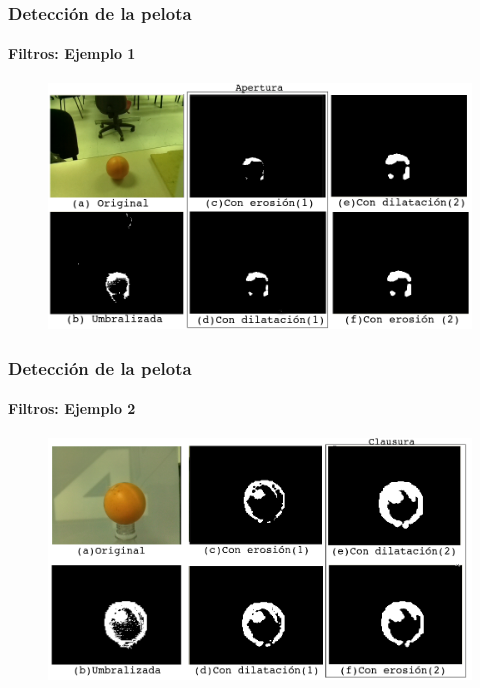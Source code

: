 \documentclass{beamer}
\begin{document}
\begin{frame}
\frametitle{Detecci\'on de la pelota}
\framesubtitle{Filtros: Ejemplo 1}

\begin{figure}[hbtp]
\centering
\includegraphics[scale=0.3]{filtros.png} 
\end{figure}

\end{frame}

\begin{frame}
\frametitle{Detecci\'on de la pelota}
\framesubtitle{Filtros: Ejemplo 2}

\begin{figure}[hbtp]
\centering
\includegraphics[scale=0.3]{conTodos4.png} 
\end{figure}

\end{frame}
\end{document}
